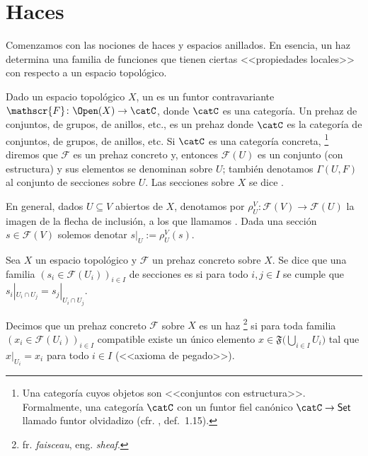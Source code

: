 \section{Haces}
Comenzamos con las nociones de haces y espacios anillados.
En esencia, un haz determina una familia de funciones que tienen ciertas <<propiedades locales>> con respecto a un espacio topológico.
\begin{mydefi}
	Dado un espacio topológico $X$, un  es un funtor contravariante $\mathscr{F} \colon \Open(X) \to \catC$,
	donde $\catC$ es una categoría.
	Un prehaz de conjuntos, de grupos, de anillos, etc., es un prehaz donde $\catC$ es la categoría de conjuntos, de grupos, de anillos, etc.
	Si $\catC$ es una categoría concreta,%
	\footnote{Una categoría cuyos objetos son <<conjuntos con estructura>>.
	Formalmente, una categoría $\catC$ con un funtor fiel canónico $\catC \to \mathsf{Set}$ llamado funtor olvidadizo (cfr. \cite{CatTh}, def.~1.15).}
	diremos que $\mathscr{F}$ es un prehaz concreto y, entonces $\mathscr{F}(U)$ es un conjunto (con estructura)
	y sus elementos se denominan  sobre $U$; también denotamos $\Gamma(U, F)$ al conjunto de secciones sobre $U$.
	Las secciones sobre $X$ se dice .

	En general, dados $U \subseteq V$ abiertos de $X$, denotamos por $\rho^V_U \colon \mathscr{F}(V) \to \mathscr{F}(U)$
	la imagen de la flecha de inclusión, a los que llamamos .
	Dada una sección $s \in \mathscr{F}(V)$ solemos denotar $s|_U := \rho^V_U(s)$.
\end{mydefi}

\begin{mydef}
	Sea $X$ un espacio topológico y $\mathscr{F}$ un prehaz concreto sobre $X$.
	Se dice que una familia $(s_i \in \mathscr{F}(U_i))_{i\in I}$ de secciones es 
	si para todo $i, j \in I$ se cumple que $s_i|_{U_i\cap U_j} = s_j|_{U_i\cap U_j}$.

	Decimos que un prehaz concreto $\mathscr{F}$ sobre $X$ es un haz%
	\footnote{fr. \textit{faisceau}, eng. \textit{sheaf}.}
	si para toda familia $(x_i \in \mathscr{F}(U_i))_{i\in I}$ compatible existe un único elemento $x \in \mathfrak{F}\big( \bigcup_{i\in I} U_i \big)$
	tal que $x|_{U_i} = x_i$ para todo $i \in I$ (<<axioma de pegado>>).
\end{mydef}

